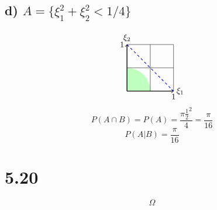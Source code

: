 \documentclass[11pt, a4paper]{article} %
\begin{document}
\subsection*{d) $A = \{\xi_1^2 + \xi_2^2 < 1/4\}$}
$$\begin{tikzpicture}
    \fill[green!25] (1,0) arc (0:90:1) -- (0,0) -- cycle;
    \draw[thin] (0,0) grid[step=1cm] (2,2);
    \draw[thick,->] (0,0) -- (0,2) node[above] {$\xi_2$};
    \draw[thick,->] (0,0) -- (2,0) node[right] {$\xi_1$};
    \node[below] at (2,0) {$1$};
    \node[left] at (0,2) {$1$};
    \draw[blue, thick, dashed] (0,2) -- (1,1) -- (2,0);
\end{tikzpicture}$$
$$P(A \cap B) = P(A) = \frac{\pi \frac{1}{2}^2}{4} = \frac{\pi}{16}$$
$$P(A|B) = \frac{\pi}{16}$$


\section*{5.20}
$$\Omega$$
\end{document}
